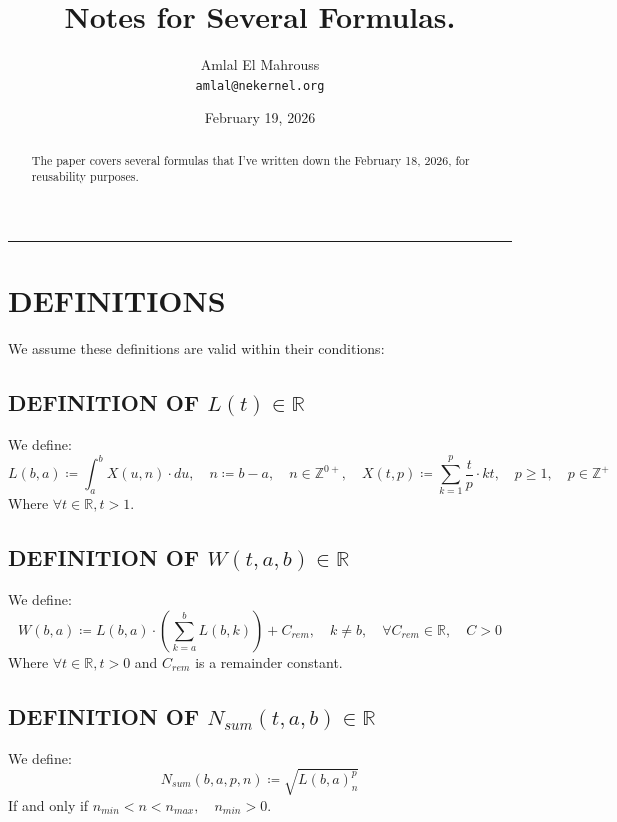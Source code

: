 \documentclass[11pt, a4paper]{article}
\title{Notes for Several Formulas.}
\author{Amlal El Mahrouss\\\texttt{amlal@nekernel.org}}
\date{February 19, 2026}
\begin{document}
\maketitle

\begin{center}
	\rule[0.01cm]{17cm}{0.01cm}
\end{center}

\begin{abstract}
\begin{center}
    The paper covers several formulas that I've written down the February 18, 2026, for reusability purposes.
\end{center}
\end{abstract}

\section{DEFINITIONS}

We assume these definitions are valid within their conditions:

\subsection{DEFINITION OF $L(t) \in \mathbb{R}$}
We define:
\begin{equation}
	L(b, a) \coloneqq \int_{a}^{b}X(u, n)\cdot du, \quad n \coloneqq b - a, \quad n \in \mathbb{Z}^{0+}, \quad X(t, p) \coloneqq \sum_{k=1}^{p}\frac{t}{p}\cdot kt, \quad p \geq 1, \quad p \in \mathbb{Z}^{+}
\end{equation}
Where $\forall t \in \mathbb{R}, t > 1$.

\subsection{DEFINITION OF $W(t, a, b) \in \mathbb{R}$}
We define:
\begin{equation}
    W(b, a) \coloneqq L(b, a)\cdot(\sum_{k=a}^{b} L(b, k)) +C_{rem}, \quad k \neq b,\quad \forall C_{rem} \in \mathbb{R}, \quad C > 0
\end{equation}
Where $\forall t \in \mathbb{R}, t > 0$ and $C_{rem}$ is a remainder constant.

\subsection{DEFINITION OF $N_{sum}(t, a, b) \in \mathbb{R}$}

We define:
\begin{equation}
    N_{sum}(b, a, p, n) \coloneqq \sqrt{L(b, a)^p_{n}}
\end{equation}
If and only if $n_{min} < n < n_{max}, \quad n_{min} > 0$.
\end{document}
